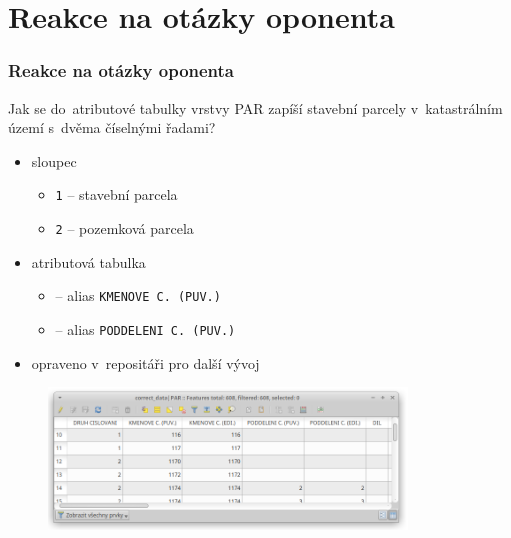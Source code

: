 \documentclass{beamer}
\begin{document}

\section{Reakce na otázky oponenta}

\begin{frame}

\frametitle{Reakce na otázky oponenta}

Jak se do~atributové tabulky vrstvy PAR zapíší stavební parcely v~katastrálním území s~dvěma číselnými řadami?

\begin{itemize}
	\item sloupec \texttt{}
	\begin{itemize}
		\item \texttt{1} – stavební parcela
		\item \texttt{2} – pozemková parcela
	\end{itemize}
	\item atributová tabulka
	\begin{itemize}
		\item \texttt{} – alias \texttt{KMENOVE C. (PUV.)}
		\item \texttt{} – alias \texttt{PODDELENI C. (PUV.)}
	\end{itemize}
	\item opraveno v~repositáři pro další vývoj
\end{itemize}

\begin{figure}[ht]
	\includegraphics[width=0.85\textwidth]{pictures/nacteni-tabulka.png}
\end{figure}

\end{frame}

\end{document}
